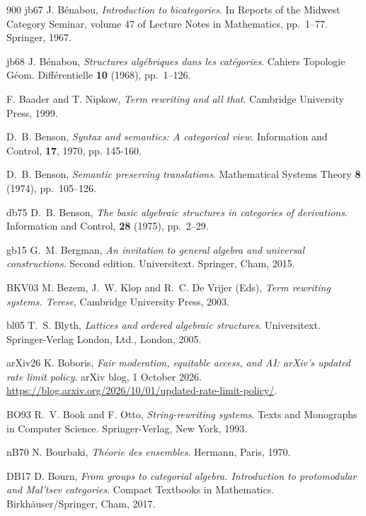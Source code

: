 \begin{thebibliography}{900}
\bibitem%
{jb67} J. B\'{e}nabou, \emph{Introduction to bicategories}. In Reports of the Midwest Category Seminar, volume 47 of Lecture
Notes in Mathematics, pp.~1--77. Springer, 1967.

\bibitem%
{jb68} J. B\'{e}nabou, \emph{Structures alg\'{e}briques dans les cat\'{e}gories}. Cahiers Topologie G\'{e}om. Diff\'{e}rentielle \textbf{10} (1968),  pp.~1--126.

F. Baader and T. Nipkow, \emph{Term rewriting and all that}. Cambridge University Press, 1999.

D.~B. Benson, \emph{Syntax and semantics: A categorical view}. Information and Control,
\textbf{17}, 1970, pp. 145-160.

D.~B. Benson, \emph{Semantic preserving translations}. Mathematical Systems Theory \textbf{8} (1974),  pp.~105--126.

\bibitem%
{db75} D.~B. Benson, \emph{The basic algebraic structures in categories of derivations}. Information and Control, \textbf{28} (1975), pp.~2--29.

\bibitem%
{gb15} G.~M. Bergman, \emph{An invitation to general algebra and universal constructions}. Second edition. Universitext. Springer, Cham, 2015.

\bibitem%
{BKV03} M. Bezem, J.~W. Klop and R.~C. De Vrijer (Eds), \emph{Term rewriting systems. Terese}, Cambridge University Press, 2003.    

\bibitem%
{bl05} T.~S. Blyth, \emph{Lattices and ordered algebraic structures}. Universitext. Springer-Verlag London, Ltd., London, 2005.

\bibitem%
{arXiv26} K. Boboris, \emph{Fair moderation, equitable access, and AI: arXiv's updated rate limit policy}. arXiv blog, 1 October 2026. \url{https://blog.arxiv.org/2026/10/01/updated-rate-limit-policy/}.

\bibitem%
{BO93} R.~V. Book and F. Otto, \emph{String-rewriting systems}.
Texts and Monographs in Computer Science. Springer-Verlag, New York, 1993. 

\bibitem%
{nB70} N. Bourbaki, \emph{Th{\'{e}}orie des ensembles}. Hermann, Paris, 1970.

\bibitem%
{DB17} D. Bourn, \emph{From groups to categorial algebra. Introduction to protomodular and Mal'tsev categories}. Compact Textbooks in Mathematics. Birkh\"{a}user/Springer, Cham, 2017.



\end{thebibliography}
